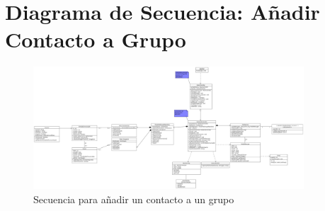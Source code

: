 \chapter{Diagrama de Secuencia: Añadir Contacto a Grupo}

\begin{figure}[H]
    \centering
    \includegraphics[width=0.9\textwidth]{images/AppChat_Domino.png}
    \caption{Secuencia para añadir un contacto a un grupo}
\end{figure}
